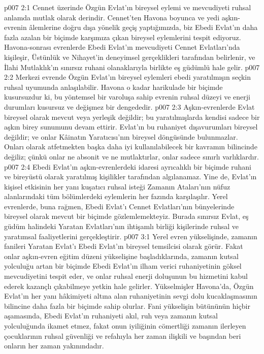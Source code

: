 \vs p007 2:1 Cennet üzerinde Özgün Evlat’ın bireysel eylemi ve mevcudiyeti ruhsal anlamda mutlak olarak derindir. Cennet’ten Havona boyunca ve yedi aşkın\hyp{}evrenin âlemlerine doğru dışa yönelik geçiş yaptığımızda, biz Ebedi Evlat’ın daha fazla azalan bir biçimde karşımıza çıkan bireysel eylemlerini tespit ediyoruz. Havona\hyp{}sonrası evrenlerde Ebedi Evlat’ın mevcudiyeti Cennet Evlatları’nda kişileşir, Üstünlük ve Nihayet’in deneyimsel gerçeklikleri tarafından belirlenir, ve İlahi Mutlaklık’ın sınırsız ruhani olanaklarıyla birlikte eş güdümlü hale gelir.
\vs p007 2:2 Merkezi evrende Özgün Evlat’ın bireysel eylemleri ebedi yaratılmışın seçkin ruhsal uyumunda anlaşılabilir. Havona o kadar harikulade bir biçimde kusursuzdur ki, bu yöntemsel bir varoluşa sahip evrenin ruhsal düzeyi ve enerji durumları kusursuz ve değişmez bir dengededir.
\vs p007 2:3 Aşkın\hyp{}evrenlerde Evlat bireysel olarak mevcut veya yerleşik değildir; bu yaratılmışlarda kendisi sadece bir aşkın birey sunumunu devam ettirir. Evlat’ın bu ruhaniyet dışavurumları bireysel değildir; ve onlar Kâinatın Yaratıcısı’nın bireysel döngüsünde bulunmazlar. Onları  olarak atfetmekten başka daha iyi kullanılabilecek bir kavramın bilincinde değiliz; çünkü onlar ne absonit ve ne mutlaktırlar, onlar sadece sınırlı varlıklardır.
\vs p007 2:4 Ebedi Evlat’ın aşkın\hyp{}evrenlerdeki idaresi ayrıcalıklı bir biçimde ruhani ve bireyüstü olarak yaratılmış kişilikler tarafından algılanamaz. Yine de, Evlat’ın kişisel etkisinin her yanı kuşatıcı ruhsal isteği Zamanın Ataları’nın nüfuz alanlarındaki tüm bölümlerdeki eylemlerin her fazında karşılaşılır. Yerel evrenlerde, buna rağmen, Ebedi Evlat’ı Cennet Evlatları’nın bünyelerinde bireysel olarak mevcut bir biçimde gözlemlemekteyiz. Burada sınırsız Evlat, eş güdüm halindeki Yaratan Evlatları’nın ihtişamlı birliği kişilerinde ruhsal ve yaratımsal faaliyetlerini gerçekleştirir.
\vs p007 3:1 Yerel evren yükselişinde, zamanın fanileri Yaratan Evlat’ı Ebedi Evlat’ın bireysel temsilcisi olarak görür. Fakat onlar aşkın\hyp{}evren eğitim düzeni yükselişine başladıklarında, zamanın kutsal yolculuğu artan bir biçimde Ebedi Evlat’ın ilham verici ruhaniyetinin göksel mevcudiyetini tespit eder, ve onlar ruhsal enerji doluşunun bu hizmetini kabul ederek kazançlı çıkabilmeye yetkin hale gelirler. Yükselmişler Havona’da, Özgün Evlat’ın her yanı hâkimiyeti altına alan ruhaniyetinin sevgi dolu kucaklaşmasının bilincine daha fazla bir biçimde sahip olurlar. Fani yükselişin bütününün hiçbir aşamasında, Ebedi Evlat’ın ruhaniyeti akıl, ruh veya zamanın kutsal yolculuğunda ikamet etmez, fakat onun iyiliğinin cömertliği zamanın ilerleyen çocuklarının ruhsal güvenliği ve refahıyla her zaman ilişkili ve başından beri onların her zaman yakınındadır.
